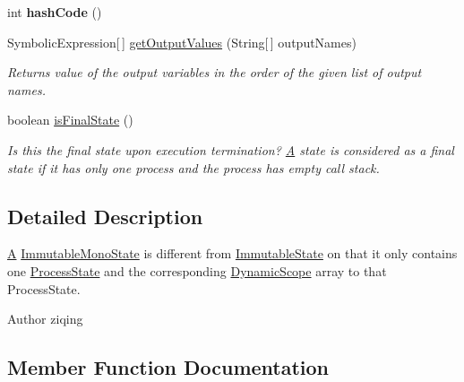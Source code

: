 \begin{DoxyCompactItemize}
\item 
\hypertarget{classedu_1_1udel_1_1cis_1_1vsl_1_1civl_1_1state_1_1common_1_1immutable_1_1ImmutableMonoState_a866d58bbaa2b7a159b9698e0ee8b6a0c}{}int {\bfseries hash\+Code} ()\label{classedu_1_1udel_1_1cis_1_1vsl_1_1civl_1_1state_1_1common_1_1immutable_1_1ImmutableMonoState_a866d58bbaa2b7a159b9698e0ee8b6a0c}

\item 
Symbolic\+Expression\mbox{[}$\,$\mbox{]} \hyperlink{classedu_1_1udel_1_1cis_1_1vsl_1_1civl_1_1state_1_1common_1_1immutable_1_1ImmutableMonoState_ad62141dbb70b8135cbf006d9be7fa318}{get\+Output\+Values} (String\mbox{[}$\,$\mbox{]} output\+Names)
\begin{DoxyCompactList}\small\item\em Returns value of the output variables in the order of the given list of output names. \end{DoxyCompactList}\item 
boolean \hyperlink{classedu_1_1udel_1_1cis_1_1vsl_1_1civl_1_1state_1_1common_1_1immutable_1_1ImmutableMonoState_a91cdff28e6e914a211167e4a34e7abea}{is\+Final\+State} ()
\begin{DoxyCompactList}\small\item\em Is this the final state upon execution termination? \hyperlink{structA}{A} state is considered as a final state if it has only one process and the process has empty call stack. \end{DoxyCompactList}\end{DoxyCompactItemize}


\subsection{Detailed Description}
\hyperlink{structA}{A} \hyperlink{classedu_1_1udel_1_1cis_1_1vsl_1_1civl_1_1state_1_1common_1_1immutable_1_1ImmutableMonoState}{Immutable\+Mono\+State} is different from \hyperlink{classedu_1_1udel_1_1cis_1_1vsl_1_1civl_1_1state_1_1common_1_1immutable_1_1ImmutableState}{Immutable\+State} on that it only contains one \hyperlink{}{Process\+State} and the corresponding \hyperlink{}{Dynamic\+Scope} array to that Process\+State. 

\begin{DoxyAuthor}{Author}
ziqing 
\end{DoxyAuthor}


\subsection{Member Function Documentation}
\hypertarget{classedu_1_1udel_1_1cis_1_1vsl_1_1civl_1_1state_1_1common_1_1immutable_1_1ImmutableMonoState_a35342bb1fd19c20bc4b96638b4c0f3ee}{}
